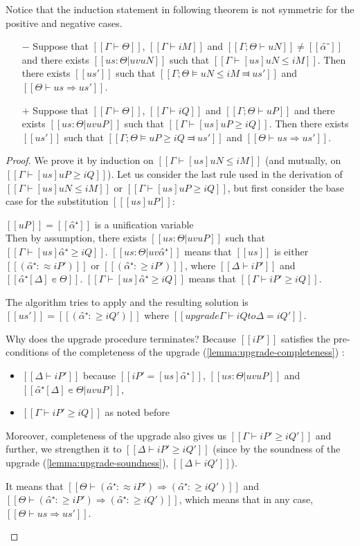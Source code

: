 Notice that the induction statement in following theorem is not symmetric for the positive and negative cases.
\begin{theorem}
    \hfill
    \begin{itemize}
        \item [$-$] Suppose that $[[Γ ⊢ Θ]]$, $[[Γ ⊢ iM]]$ and $[[Γ ; Θ ⊢ uN]] \neq [[α̂⁻]]$ and there exists $[[us : Θ | uv uN]]$ such that $[[ Γ ⊢ [us]uN ≤ iM ]]$.
        Then there exists $[[us']]$ such that $[[Γ ; Θ ⊨ uN ≤ iM ⫤ us']]$
        and $[[Θ ⊢ us ⇒ us']]$.
        
        \item [$+$] Suppose that $[[Γ ⊢ Θ]]$, $[[Γ ⊢ iQ]]$ and $[[Γ ; Θ ⊢ uP]]$ and
        there exists $[[us : Θ | uv uP]]$ such that $[[ Γ ⊢ [us]uP ≥ iQ ]]$.
        Then there exists $[[us']]$ such that $[[Γ ; Θ ⊨ uP ≥ iQ ⫤ us']]$
        and $[[Θ ⊢ us ⇒ us']]$.
    \end{itemize}
\end{theorem}
\begin{proof}
    We prove it by induction on $[[ Γ ⊢ [us]uN ≤ iM ]]$ (and mutually, on $[[ Γ ⊢ [us]uP ≥ iQ ]]$).
    Let us consider the last rule used in the derivation of $[[ Γ ⊢ [us]uN ≤ iM ]]$ or $[[ Γ ⊢ [us]uP ≥ iQ ]]$,
    but first consider the base case for the substitution $[[ [us]uP ]]$:
    \begin{caseof}
        \item $[[uP]] = [[ α̂⁺ ]]$ is a unification variable\\
        Then by assumption, there exists $[[us : Θ | uv uP]]$ such that $[[ Γ ⊢ [us]α̂⁺ ≥ iQ ]]$.
        $[[us : Θ | uv α̂⁺]]$ means that  $[[us]]$ is either $[[ (α̂⁺ :≈ iP') ]]$ or $[[ (α̂⁺ :≥ iP') ]]$,
        where $[[Δ ⊢ iP']]$ and $[[α̂⁺[Δ] ∊ Θ]]$.
        $[[ Γ ⊢ [us]α̂⁺ ≥ iQ ]]$ means that $[[Γ ⊢ iP' ≥ iQ]]$.

        The algorithm tries to apply 
        and the resulting solution is $[[us']] = [[(α̂⁺ :≥ iQ')]]$ where
        $[[upgrade Γ ⊢ iQ to Δ = iQ']]$.

        Why does the upgrade procedure terminates?
        Because $[[iP']]$ satisfies the pre-conditions of the completeness of the upgrade
        (\cref{lemma:upgrade-completeness})
        :
        \begin{itemize}
            \item $[[Δ ⊢ iP']]$ because $[[iP' = [us]α̂⁺]]$, $[[us : Θ | uv uP]]$ and 
            $[[α̂⁺[Δ] ∊ Θ | uv uP]]$,
            \item $[[Γ ⊢ iP' ≥ iQ]]$ as noted before
        \end{itemize}
        Moreover, completeness of the upgrade also gives us $[[Γ ⊢ iP' ≥ iQ']]$
        and further, we strengthen it to $[[Δ ⊢ iP' ≥ iQ']]$
        (since by the soundness of the upgrade (\cref{lemma:upgrade-soundness}),
        $[[Δ ⊢ iQ']]$).

        It means that $[[Θ ⊢ (α̂⁺ :≈ iP') ⇒ (α̂⁺ :≥ iQ') ]]$ and 
        $[[ Θ ⊢ (α̂⁺ :≥ iP') ⇒ (α̂⁺ :≥ iQ') ]]$, which means that in any case, 
        $[[ Θ ⊢ us ⇒ us']]$.
    \end{caseof}
\end{proof}


